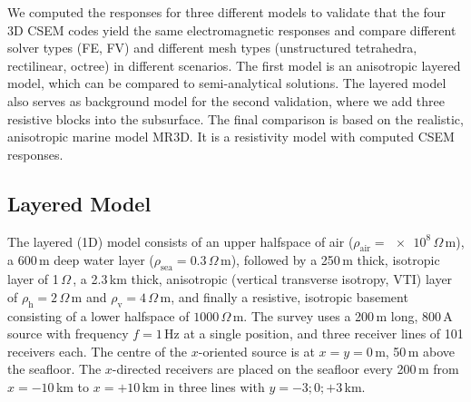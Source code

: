 \documentclass[extra, camera,%
]{gji}
\newcommand{\ohmm}{\ensuremath{\Omega\,}\text{m}\xspace}
\begin{document}
We computed the responses for three different models to validate that the four 3D CSEM codes yield the same electromagnetic responses and compare different solver types (FE, FV) and different mesh types (unstructured tetrahedra, rectilinear, octree) in different scenarios. The first model is an anisotropic\added{,} layered model, which can be compared to semi-analytical solutions. The layered model also serves as background model for the second validation, where we add three resistive blocks into the subsurface. The final comparison is based on the realistic, anisotropic marine model MR3D. It is a resistivity model  with computed CSEM responses.

\subsection{Layered Model}

The layered (1D) model consists of an upper halfspace of air ($\rho_\text{air}=\num{e8}\,\ohmm$), a 600\,m deep water layer ($\rho_\text{sea}=0.3\,\ohmm$), followed by a 250\,m thick, isotropic layer of 1\,\ohmm, a 2.3\,km thick, anisotropic (vertical transverse isotropy, VTI) layer of $\rho_\text{h}=2\,\ohmm$ and $\rho_\text{v}=4\,\ohmm$, and finally a resistive, isotropic basement consisting of a lower halfspace of $1000\,\ohmm$. The survey uses a 200\,m long, 800\,A source  with frequency $f=1\,$Hz at a single position, and three receiver lines of 101 receivers each. The centre of the $x$-oriented source is at $x=y=0\,$m, 50\,m above the seafloor. The $x$-directed receivers are placed on the seafloor every 200\,m from $x=-10\,$km to $x=+10\,$km in three lines with $y=-3; 0; +3\,$km.
\end{document}
